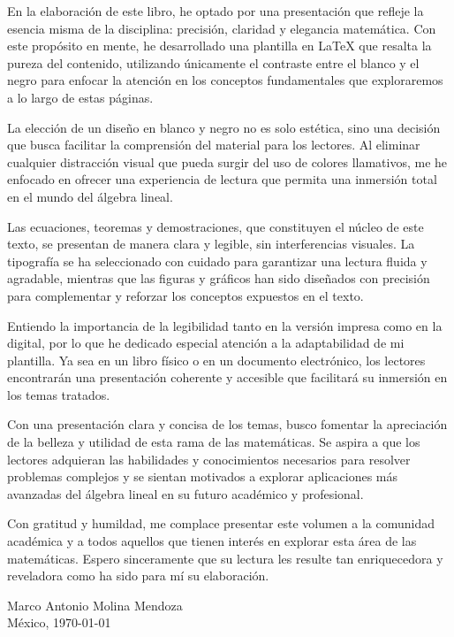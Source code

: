 En la elaboración de este libro, he optado por una presentación que refleje la esencia misma de la disciplina: precisión, claridad y elegancia matemática. Con este propósito en mente, he desarrollado una plantilla en LaTeX que resalta la pureza del contenido, utilizando únicamente el contraste entre el blanco y el negro para enfocar la atención en los conceptos fundamentales que exploraremos a lo largo de estas páginas.

La elección de un diseño en blanco y negro no es solo estética, sino una decisión que busca facilitar la comprensión del material para los lectores. Al eliminar cualquier distracción visual que pueda surgir del uso de colores llamativos, me he enfocado en ofrecer una experiencia de lectura que permita una inmersión total en el mundo del álgebra lineal.

Las ecuaciones, teoremas y demostraciones, que constituyen el núcleo de este texto, se presentan de manera clara y legible, sin interferencias visuales. La tipografía se ha seleccionado con cuidado para garantizar una lectura fluida y agradable, mientras que las figuras y gráficos han sido diseñados con precisión para complementar y reforzar los conceptos expuestos en el texto.

Entiendo la importancia de la legibilidad tanto en la versión impresa como en la digital, por lo que he dedicado especial atención a la adaptabilidad de mi plantilla. Ya sea en un libro físico o en un documento electrónico, los lectores encontrarán una presentación coherente y accesible que facilitará su inmersión en los temas tratados.

Con una presentación clara y concisa de los temas, busco fomentar la apreciación de la belleza y utilidad de esta rama de las matemáticas. Se aspira a que los lectores adquieran las habilidades y conocimientos necesarios para resolver problemas complejos y se sientan motivados a explorar aplicaciones más avanzadas del álgebra lineal en su futuro académico y profesional.

Con gratitud y humildad, me complace presentar este volumen a la comunidad académica y a todos aquellos que tienen interés en explorar esta área de las matemáticas. Espero sinceramente que su lectura les resulte tan enriquecedora y reveladora como ha sido para mí su elaboración.

\begin{flushright}
    Marco Antonio Molina Mendoza\\ 
    México, \today\\ 
\end{flushright}